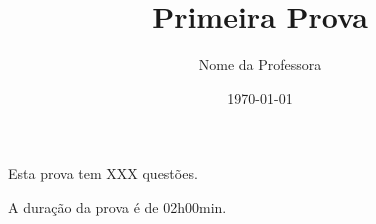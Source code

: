 \documentclass[12pt, oneside]{ufpeexam}
\institute{Centro de Informática}
\author[a]{Nome da Professora} %
\title{Primeira Prova}
\date{\today}
\begin{document}
\makeheader


\begin{instructions}
\begin{compactitem}
\item Esta prova tem XXX questões.
\item A duração da prova é de 02h00min.
\end{compactitem}
\end{instructions}


\begin{question}[\smallskip (2,0pt)\\]
	\lipsum[1-2][3-4]
\end{question}

\begin{answer}
	\lipsum[5-6][7-8]
\end{answer}


\begin{question}[\smallskip (2,0pt)\\]
	\lipsum[9-11][12-15]
\end{question}
\begin{answer}
	\lipsum[16-19][20-23]
\end{answer}


\begin{question}
	\lipsum[24-30][1-10]
\end{question}
\begin{answer}
	\lipsum[30-40][10-60]
\end{answer}




\eof
\end{document}
